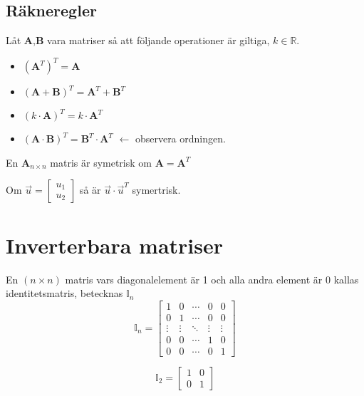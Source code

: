 \subsection{Räkneregler} %
\label{sub:r_kneregler2}
Låt \textbf{A},\textbf{B} vara matriser så att följande operationer är giltiga, $k \in \mathbb{R}$.
\begin{itemize}
	\item $(\mathbf{A}^T)^T = \mathbf{A}$
	\item $(\mathbf{A} + \mathbf{B})^T = \mathbf{A}^T + \mathbf{B}^T$
	\item $(k \cdot \mathbf{A})^T = k \cdot \mathbf{A}^T$
	\item $(\mathbf{A} \cdot \mathbf{B})^T = \mathbf{B}^T \cdot \mathbf{A}^T$ $\leftarrow$ observera ordningen.
\end{itemize}
\begin{Def}
    En $\mathbf{A}_{n \times n}$ matris är symetrisk om $\mathbf{A} = \mathbf{A}^T$
\end{Def}
\begin{Ex}
    Om $\vec{u} = \begin{bmatrix} u_1\\u_2 \end{bmatrix}$ så är $\vec{u} \cdot \vec{u}^T$ symertrisk.
\end{Ex}

\section{Inverterbara matriser} %
\label{sec:inverterbara_matriser}
\begin{Def}
    En $(n \times n)$ matris vars diagonalelement är 1 och alla andra element är 0 kallas identitetsmatris, betecknas $\mathbb{I}_n$
    \[
        \mathbb{I}_n = \begin{bmatrix} 1&0&\cdots&0&0\\ 
        0&1&\cdots&0&0 \\ 
        \vdots&\vdots&\ddots&\vdots&\vdots \\ 
        0&0&\cdots&1&0 \\ 
        0&0&\cdots&0&1 \end{bmatrix}
    \]
\end{Def}
\begin{Ex}
    \[
        \mathbb{I}_2 = \begin{bmatrix} 1&0\\0&1 \end{bmatrix}
    \]
\end{Ex}

